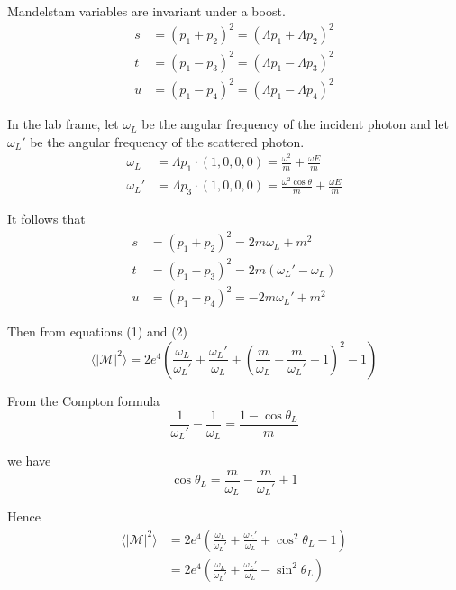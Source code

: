 \documentclass[12pt]{article}
\begin{document}
Mandelstam variables are invariant under a boost.
\begin{equation*}
\begin{aligned}
s&=(p_1+p_2)^2=(\Lambda p_1+\Lambda p_2)^2
\\
t&=(p_1-p_3)^2=(\Lambda p_1-\Lambda p_3)^2
\\
u&=(p_1-p_4)^2=(\Lambda p_1-\Lambda p_4)^2
\end{aligned}
\end{equation*}

In the lab frame, let $\omega_L$ be the angular frequency of the incident photon
and let $\omega_L'$ be the angular frequency of the scattered photon.
\begin{equation*}
\begin{aligned}
\omega_L&=\Lambda p_1\cdot(1,0,0,0)=\frac{\omega^2}{m}+\frac{\omega E}{m}
\\
\omega_L'&=\Lambda p_3\cdot(1,0,0,0)=\frac{\omega^2\cos\theta}{m}+\frac{\omega E}{m}
\end{aligned}
\end{equation*}

It follows that
\begin{equation*}
\begin{aligned}
s&=(p_1+p_2)^2=2m\omega_L+m^2
\\
t&=(p_1-p_3)^2=2m(\omega_L' - \omega_L)
\\
u&=(p_1-p_4)^2=-2 m \omega_L' + m^2
\end{aligned}
\end{equation*}

Then from equations (1) and (2)
\begin{equation*}
\langle|\mathcal{M}|^2\rangle=
2e^4\left(
\frac{\omega_L}{\omega_L'}+\frac{\omega_L'}{\omega_L}
+\left(\frac{m}{\omega_L}-\frac{m}{\omega_L'}+1\right)^2-1
\right)
\end{equation*}

From the Compton formula
\begin{equation*}
\frac{1}{\omega_L'}-\frac{1}{\omega_L}=\frac{1-\cos\theta_L}{m}
\end{equation*}

we have
\begin{equation*}
\cos\theta_L=\frac{m}{\omega_L}-\frac{m}{\omega_L'}+1
\end{equation*}

Hence
\begin{align*}
\langle|\mathcal{M}|^2\rangle
&=2e^4\left(
\frac{\omega_L}{\omega_L'}+\frac{\omega_L'}{\omega_L}+\cos^2\theta_L-1
\right)
\\
&=2e^4\left(
\frac{\omega_L}{\omega_L'}+\frac{\omega_L'}{\omega_L}-\sin^2\theta_L
\right)
\end{align*}
\end{document}
